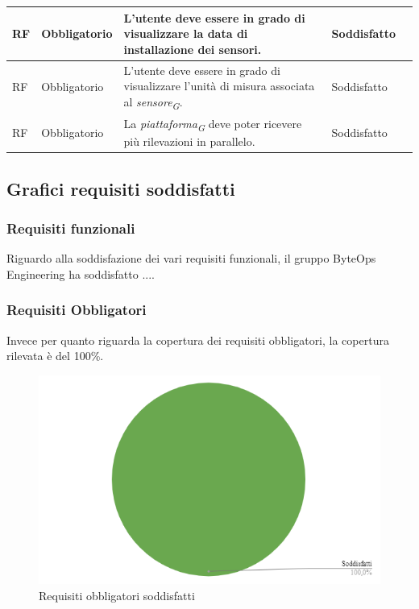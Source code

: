 \begin{longtable}{|C{1.5cm}|C{2cm}|L{5cm}|C{2cm}|C{1.5cm}|}
    \hline
     RF & Obbligatorio & L'utente deve essere in grado di visualizzare la data di installazione dei sensori.& Soddisfatto \\

    \hline
     RF & Obbligatorio & L'utente deve essere in grado di visualizzare l'unità di misura associata al \textit{sensore}\textsubscript{\textit{G}}.& Soddisfatto \\
    
    \hline
     RF & Obbligatorio & La \textit{piattaforma}\textsubscript{\textit{G}} deve poter ricevere più rilevazioni in parallelo. & Soddisfatto \\

    \hline
    
\end{longtable}

\subsection{Grafici requisiti soddisfatti}
\subsubsection{Requisiti funzionali}
Riguardo alla soddisfazione dei vari requisiti funzionali, il gruppo ByteOps Engineering ha soddisfatto ....

\subsubsection{Requisiti Obbligatori}
Invece per quanto riguarda la copertura dei requisiti obbligatori, la copertura rilevata è del 100\%.
\begin{figure}[H]
    \centering
    \includegraphics[width=1\textwidth]{../Images/SpecificaTecnica/req_obbligatori.PNG}
    \caption{Requisiti obbligatori soddisfatti}
    \label{fig: reqob}
\end{figure}
